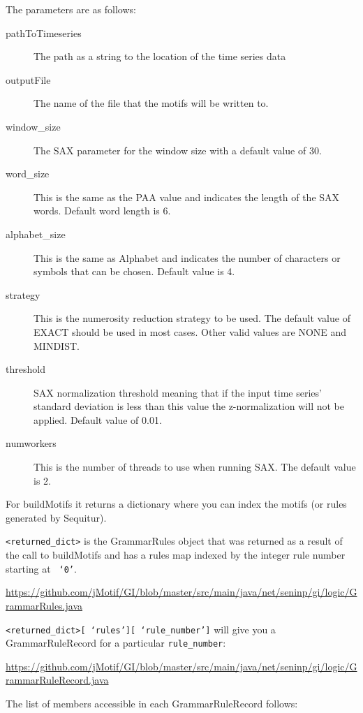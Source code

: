 \documentclass[titlepage, letterpaper, 12pt]{article}
\def\bsq#1{%
	\lq{#1}\rq}
\begin{document}
The parameters are as follows:
\begin{description}
	\item[pathToTimeseries] The path as a string to the location of the time series data
	\item[outputFile] The name of the file that the motifs will be written to.
	\item[window\_size] The SAX parameter for the window size with a default value of 30.
	\item[word\_size] This is the same as the PAA value and indicates the length of the SAX words.  Default word length is 6.
	\item[alphabet\_size] This is the same as Alphabet and indicates the number of characters or symbols that can be chosen.  Default value is 4.
	\item[strategy] This is the numerosity reduction strategy to be used.  The default value of EXACT should be used in most cases.  Other valid values are NONE and MINDIST.
	\item[threshold] SAX normalization threshold meaning that if the input time series' standard deviation is less than this value the z-normalization will not be applied. Default value of 0.01.
	\item[numworkers] This is the number of threads to use when running SAX.  The default value is 2.
\end{description}

For buildMotifs it returns a dictionary where you can index the motifs (or rules generated by Sequitur).

\texttt{<returned\_dict>} is the GrammarRules object that was returned as a result of the call to buildMotifs and has a rules map indexed by the integer rule number starting at \texttt{\bsq{0}}.

\small{\url{https://github.com/jMotif/GI/blob/master/src/main/java/net/seninp/gi/logic/GrammarRules.java}}

\texttt{<returned\_dict>[\bsq{rules}][\bsq{rule\_number}]} will give you a GrammarRuleRecord for a particular \texttt{rule\_number}:

\small{\url{https://github.com/jMotif/GI/blob/master/src/main/java/net/seninp/gi/logic/GrammarRuleRecord.java}}

The list of members accessible in each GrammarRuleRecord follows:
\end{document}
